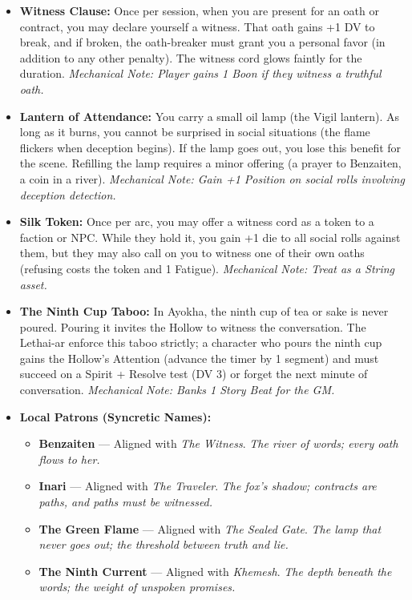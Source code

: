 \begin{itemize}
\item \textbf{Witness Clause:} Once per session, when you are present for an oath or contract, you may declare yourself a witness. That oath gains +1 DV to break, and if broken, the oath-breaker must grant you a personal favor (in addition to any other penalty). The witness cord glows faintly for the duration. \textit{Mechanical Note: Player gains 1 Boon if they witness a truthful oath.}
\item \textbf{Lantern of Attendance:} You carry a small oil lamp (the Vigil lantern). As long as it burns, you cannot be surprised in social situations (the flame flickers when deception begins). If the lamp goes out, you lose this benefit for the scene. Refilling the lamp requires a minor offering (a prayer to Benzaiten, a coin in a river). \textit{Mechanical Note: Gain +1 Position on social rolls involving deception detection.}
\item \textbf{Silk Token:} Once per arc, you may offer a witness cord as a token to a faction or NPC. While they hold it, you gain +1 die to all social rolls against them, but they may also call on you to witness one of their own oaths (refusing costs the token and 1 Fatigue). \textit{Mechanical Note: Treat as a String asset.}
\item \textbf{The Ninth Cup Taboo:} In Ayokha, the ninth cup of tea or sake is never poured. Pouring it invites the Hollow to witness the conversation. The Lethai-ar enforce this taboo strictly; a character who pours the ninth cup gains the Hollow's Attention (advance the timer by 1 segment) and must succeed on a Spirit + Resolve test (DV 3) or forget the next minute of conversation. \textit{Mechanical Note: Banks 1 Story Beat for the GM.}
\item \textbf{Local Patrons (Syncretic Names):}
  \begin{itemize}
    \item \textbf{Benzaiten} --- Aligned with \textit{The Witness}. \textit{The river of words; every oath flows to her.}
    \item \textbf{Inari} --- Aligned with \textit{The Traveler}. \textit{The fox's shadow; contracts are paths, and paths must be witnessed.}
    \item \textbf{The Green Flame} --- Aligned with \textit{The Sealed Gate}. \textit{The lamp that never goes out; the threshold between truth and lie.}
    \item \textbf{The Ninth Current} --- Aligned with \textit{Khemesh}. \textit{The depth beneath the words; the weight of unspoken promises.}
  \end{itemize}
\end{itemize}

